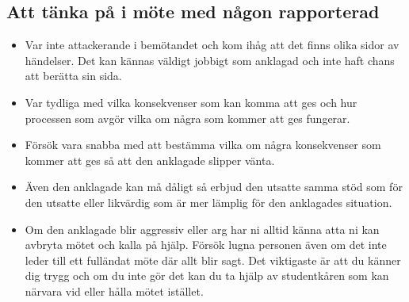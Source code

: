 \subsection{Att tänka på i möte med någon rapporterad}
\begin{itemize}
    \item Var inte attackerande i bemötandet och kom ihåg att det finns olika sidor av händelser. Det kan kännas väldigt jobbigt som anklagad och inte haft chans att berätta sin sida.
    \item Var tydliga med vilka konsekvenser som kan komma att ges och hur processen som avgör vilka om några som kommer att ges fungerar.
    \item Försök vara snabba med att bestämma vilka om några konsekvenser som kommer att ges så att den anklagade slipper vänta.
    \item Även den anklagade kan må dåligt så erbjud den utsatte samma stöd som för den utsatte eller likvärdig som är mer lämplig för den anklagades situation.
    \item Om den anklagade blir aggressiv eller arg har ni alltid känna atta ni kan avbryta mötet och kalla på hjälp. Försök lugna personen även om det inte leder till ett fulländat möte där allt blir sagt. Det viktigaste är att du känner dig trygg och om du inte gör det kan du ta hjälp av studentkåren som kan närvara vid eller hålla mötet istället.
\end{itemize}